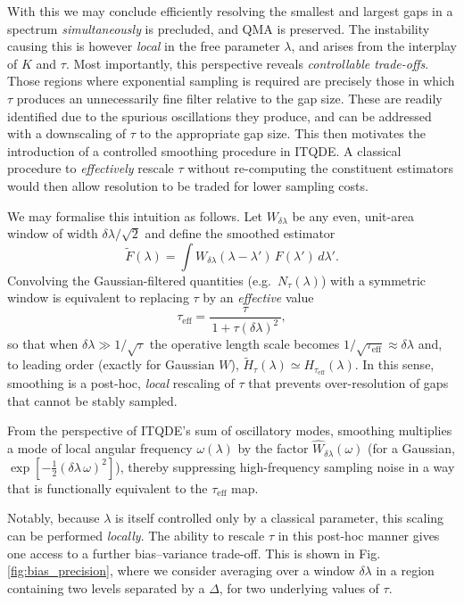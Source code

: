 \documentclass[reprint, aps,prx,showpacs,bibfootnote,preprintnumbers, mathtools, superscriptaddress, amsmath,amssymb]{revtex4-2}
\begin{document}
With this we may conclude efficiently resolving the smallest and largest gaps in a spectrum \emph{simultaneously} is precluded, and QMA is preserved. The instability causing this is however \emph{local} in the free parameter $\lambda$, and arises from the interplay of $K$ and $\tau$. Most importantly, this perspective reveals \textit{controllable trade-offs}. Those regions where exponential sampling is required are precisely those in which $\tau$ produces an unnecessarily fine filter relative to the gap size. These are readily identified due to the spurious oscillations they produce, and can be addressed with a downscaling of $\tau$ to the appropriate gap size. This then motivates the introduction of a controlled smoothing procedure in ITQDE. A classical procedure to \textit{effectively} rescale $\tau$ without re-computing the constituent estimators would then allow resolution to be traded for lower sampling costs.

We may formalise this intuition as follows. Let $W_{\delta\lambda}$ be any even, unit-area window of width $\delta\lambda/\sqrt{2}$ and define the smoothed estimator
\begin{equation}
\widetilde{F}(\lambda)
=\int W_{\delta\lambda}(\lambda-\lambda')\,F(\lambda')\,d\lambda'.
\end{equation}
Convolving the Gaussian-filtered quantities (e.g.\ $N_\tau(\lambda)$) with a symmetric window is equivalent to replacing $\tau$ by an \emph{effective} value
\begin{equation}
\tau_{\mathrm{eff}}
=\frac{\tau}{\,1+\tau(\delta \lambda)^2\,},
\end{equation}
so that when $\delta\lambda \gg 1/\sqrt{\tau}$ the operative length scale becomes $1/\sqrt{\tau_{\mathrm{eff}}}\approx \delta\lambda$ and, to leading order (exactly for Gaussian $W$), $\widetilde{H}_\tau(\lambda)\simeq H_{\tau_{\mathrm{eff}}}(\lambda)$. In this sense, smoothing is a post-hoc, \emph{local} rescaling of $\tau$ that prevents over-resolution of gaps that cannot be stably sampled.

From the perspective of ITQDE's sum of oscillatory modes, smoothing multiplies a mode of local angular frequency $\omega(\lambda)$ by the factor $\widehat{W}_{\delta\lambda}(\omega)$ (for a Gaussian, $\exp[-\tfrac12(\delta\lambda\,\omega)^2]$), thereby suppressing high-frequency sampling noise in a way that is functionally equivalent to the $\tau_{\mathrm{eff}}$ map.

 Notably, because $\lambda$ is itself controlled only by a classical parameter, this scaling can be performed \textit{locally}. The ability to rescale $\tau$ in this post-hoc manner gives one access to a further bias–variance trade-off. This is shown in Fig. \ref{fig:bias_precision}, where we consider averaging over a window $\delta \lambda$  in a region containing two levels separated by a $\Delta$, for two underlying values of $\tau$.
\end{document}
